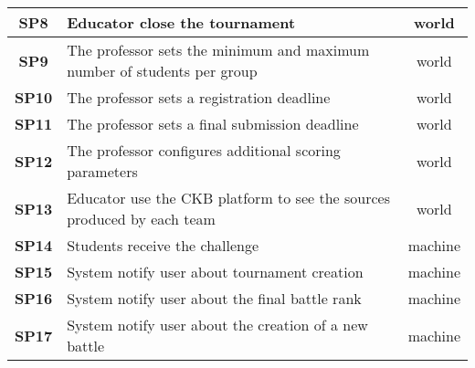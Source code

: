 \begin{table}[H]
\begin{tabularx}{\textwidth}{c|X|c}
        \textbf{SP8} & Educator close the tournament                                                                                                                             & world         \\ \midrule     
        \textbf{SP9}  & The professor sets the minimum and maximum number of students per group                                                                                             & world       \\ \midrule
         \textbf{SP10}  & The professor sets a registration deadline                                                                                                           & world         \\ \midrule
         \textbf{SP11}  & The professor sets a final submission deadline                                                                                            & world         \\ \midrule
         \textbf{SP12}  & The professor configures additional scoring parameters                                                                                   & world         \\ \midrule
        \textbf{SP13}  & Educator use the CKB platform to see the sources produced by each team                                                                                                                & world         \\ \midrule
          \textbf{SP14}  & Students receive the challenge                                                                                 & machine       \\ \midrule
        \textbf{SP15} & System notify user  about tournament creation                                                                                          & machine       \\ \midrule
        \textbf{SP16} & System notify user about the final battle rank                                                                                                                             & machine       \\ \midrule
        \textbf{SP17} & System notify user about the creation of a new battle                                                                                                                            & machine        
                                                                                                                \\ \bottomrule
    \end{tabularx}
\end{table}

